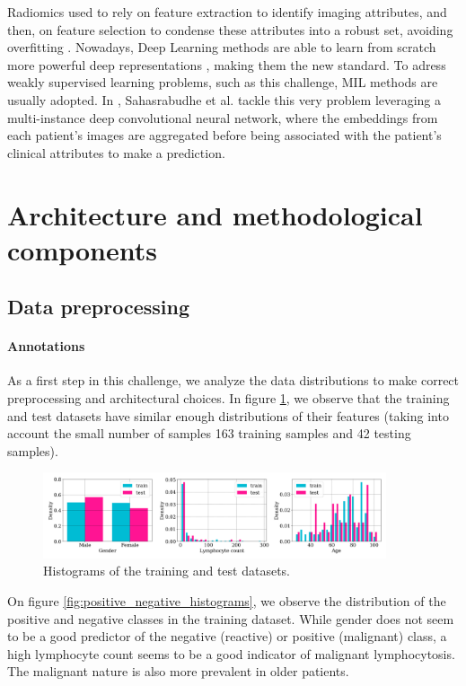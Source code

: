 \documentclass{midl}
\begin{document}
Radiomics used to rely on feature extraction to identify imaging attributes, and then, on feature selection to condense these attributes into a robust set, avoiding overfitting \cite{Vial_2018}. Nowadays, Deep Learning methods are able to learn from scratch more powerful deep representations \cite{Yao_2020}, making them the new standard. To adress weakly supervised learning problems, such as this challenge, MIL methods are usually adopted. In \cite{Sahasrabudhe_2021}, Sahasrabudhe et al. tackle this very problem leveraging a multi-instance deep convolutional neural network, where the embeddings from each patient's images are aggregated before being associated with the patient's clinical attributes to make a prediction.


\section{Architecture and methodological components}
\label{sec:methodology}

\subsection{Data preprocessing}

\paragraph*{Annotations}
As a first step in this challenge, we analyze the data distributions to make correct preprocessing and architectural choices. In figure \ref{fig:train_test_histograms}, we observe that the training and test datasets have similar enough distributions of their features (taking into account the small number of samples 163 training samples and 42 testing samples).

\begin{figure}[h]
    \centering
    \includegraphics[width=0.9\textwidth]{figures/train_test_histograms.png}
    \caption{Histograms of the training and test datasets.}
    \label{fig:train_test_histograms}
\end{figure}

On figure \ref{fig:positive_negative_histograms}, we observe the distribution of the positive and negative classes in the training dataset. While gender does not seem to be a good predictor of the negative (reactive) or positive (malignant) class, a high lymphocyte count seems to be a good indicator of malignant lymphocytosis. The malignant nature is also more prevalent in older patients.
\end{document}
